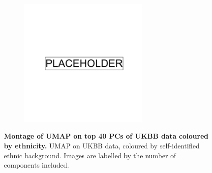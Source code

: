 \begin{figure}
    \centering
    \begin{subfigure}{0.95\textwidth}
    \includegraphics[width=0.7\textwidth]{placeholder.png}
    \end{subfigure}
    \caption[Montage of UMAP on top 40 PCs of UKBB data coloured by ethnicity]{\textbf{Montage of UMAP on top 40 PCs of UKBB data coloured by ethnicity.} UMAP on UKBB data, coloured by self-identified ethnic background. Images are labelled by the number of components included.}
    \label{fig:supp_montage_ukbb_eth}
\end{figure}

\newpage

